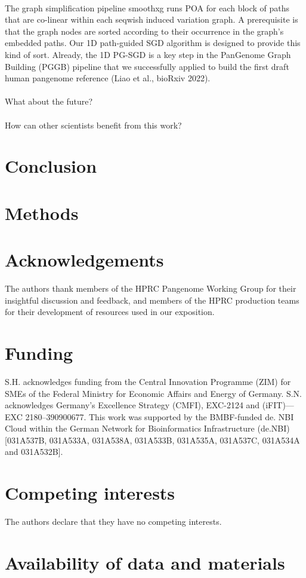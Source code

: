 \documentclass[11pt,hidelinks]{article}
\begin{document}
\paragraph{}
The graph simplification pipeline smoothxg runs POA for each block of paths that are co-linear within each seqwish induced variation graph. A prerequisite is that the graph nodes are sorted according to their occurrence in the graph's embedded paths. Our 1D path-guided SGD algorithm is designed to provide this kind of sort. Already, the 1D PG-SGD is a key step in the PanGenome Graph Building (PGGB) pipeline that we successfully applied to build the first draft human pangenome reference (Liao et al., bioRxiv 2022).
\paragraph{}
What about the future? 
\paragraph{}
How can other scientists benefit from this work?
\section{Conclusion}

\section{Methods}




\section*{Acknowledgements}
The authors thank members of the HPRC Pangenome Working Group for their insightful discussion and feedback, and members of the HPRC production teams for their development of resources used in our exposition.

\section*{Funding}
S.H. acknowledges funding from the Central Innovation Programme (ZIM) for SMEs of the Federal Ministry for Economic Affairs and Energy of Germany. S.N. acknowledges Germany’s Excellence Strategy (CMFI), EXC-2124 and (iFIT)—EXC 2180–390900677. This work was supported by the BMBF-funded de. NBI Cloud within the German Network for Bioinformatics Infrastructure (de.NBI) [031A537B, 031A533A, 031A538A, 031A533B, 031A535A, 031A537C, 031A534A and 031A532B].

\section*{Competing interests}
The authors declare that they have no competing interests.

\section*{Availability of data and materials}
\end{document}
